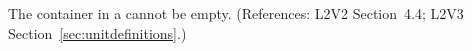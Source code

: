 The  container in a \UnitDefinition cannot be
empty.  (References: L2V2 Section~4.4; L2V3 Section~\ref{sec:unitdefinitions}.)
